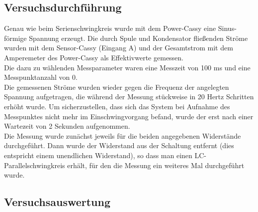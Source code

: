 \documentclass[a4paper, 11pt]{article}
\begin{document}
\subsection{Versuchsdurchführung}
Genau wie beim Serienschwingkreis wurde mit dem Power-Cassy eine Sinus-förmige Spannung erzeugt. Die durch Spule und Kondensator fließenden Ströme wurden mit dem Sensor-Cassy (Eingang A) und der Gesamtstrom mit dem Amperemeter des Power-Cassy als Effektivwerte gemessen.\\
Die dazu zu wählenden Messparameter waren eine Messzeit von 100 ms und eine Messpunktanzahl von 0.\\
Die gemessenen Ströme wurden wieder gegen die Frequenz der angelegten Spannung aufgetragen, die während der Messung stückweise in 20 Hertz Schritten erhöht wurde. Um sicherzustellen, dass sich das System bei Aufnahme des Messpunktes nicht mehr im Einschwingvorgang befand, wurde der erst nach einer Wartezeit von 2 Sekunden aufgenommen.\\
Die Messung wurde zunächst jeweils für die beiden angegebenen Widerstände durchgeführt. Dann wurde der Widerstand aus der Schaltung entfernt (dies entspricht einem unendlichen Widerstand), so dass man einen LC-Parallelschwingkreis erhält, für den die Messung ein weiteres Mal durchgeführt wurde.

\subsection{Versuchsauswertung}



\newpage
\end{document}
